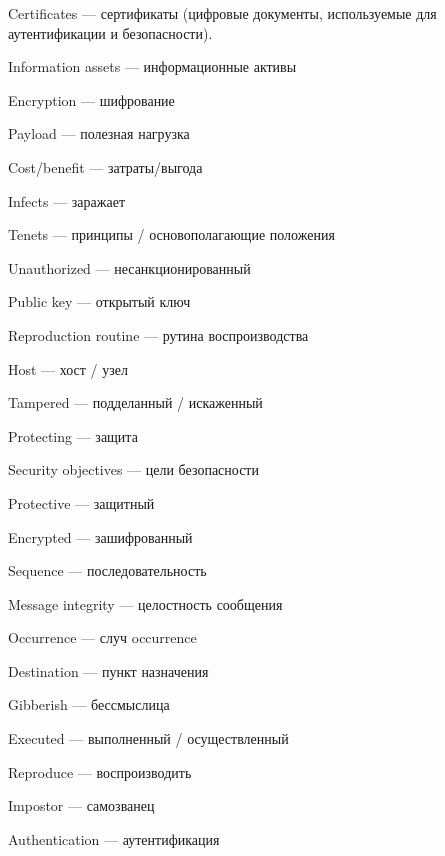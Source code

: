 	\par Certificates — сертификаты (цифровые документы, используемые для аутентификации и безопасности).
	\par Information assets — информационные активы
	\par Encryption — шифрование
	\par Payload — полезная нагрузка
	\par Cost/benefit — затраты/выгода
	\par Infects — заражает
	\par Tenets — принципы / основополагающие положения
	\par Unauthorized — несанкционированный
	\par Public key — открытый ключ
	\par Reproduction routine — рутина воспроизводства
	\par Host — хост / узел
	\par Tampered — подделанный / искаженный
	\par Protecting — защита
	\par Security objectives — цели безопасности
    \par Protective — защитный
    \par Encrypted — зашифрованный
    \par Sequence — последовательность
    \par Message integrity — целостность сообщения
    \par Occurrence — случ occurrence
    \par Destination — пункт назначения
    \par Gibberish — бессмыслица
    \par Executed — выполненный / осуществленный
    \par Reproduce — воспроизводить
    \par Impostor — самозванец
    \par Authentication — аутентификация
    \par
    \par
    \par
    \par
    \par
    \par
    \par
	
